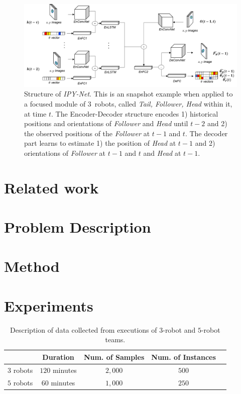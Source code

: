 \documentclass[letterpaper, 10 pt, conference]{ieeeconf}  %
\begin{document}
	\begin{figure}\centering
		\includegraphics[width=1.8\columnwidth]{fig_DL_Pipeline}
		\caption{Structure of \emph{IPY-Net}. This is an snapshot example when applied to a focused module of
			$3$~robots, called \emph{Tail, Follower, Head} within it, at time $t$. 
			The Encoder-Decoder structure encodes
			1) historical positions and orientations of \emph{Follower} and \emph{Head} 
			until $t-2$ and 2) the observed positions of the \emph{Follower} at $t-1$ and $t$. 
			The decoder part learns to estimate 1) the position of \emph{Head} at $t-1$ and 
			2) orientations of \emph{Follower} at $t-1$ and $t$ and \emph{Head} at $t-1$.   
		}
		\label{fig:DL_Pipeline}
	\end{figure}
	
	
	\section{Related work}
	\label{sec:related_work}
	
	
	\section{Problem Description} 
	\label{sec:problem_description}
	
	\section{Method}
	\label{sec:method}
	
	
	\section{Experiments} 
	\label{sec:experiments} 
	
	
	\begin{table}[t]
		\label{table:data_description}
		\centering
		\begin{tabular}{|c|c|c|c|c|}
			\hline
						&  Duration & Num. of Samples & Num. of Instances  \\ \hline
			$3$ robots & $120$ minutes & $2,000$ & $500$  \\ \hline
			$5$ robots & $60$ minutes  & $1,000$ & $250$  \\ \hline
		\end{tabular}
		\caption{Description of data collected from executions of $3$-robot and $5$-robot teams.}
	\end{table}
\end{document}
